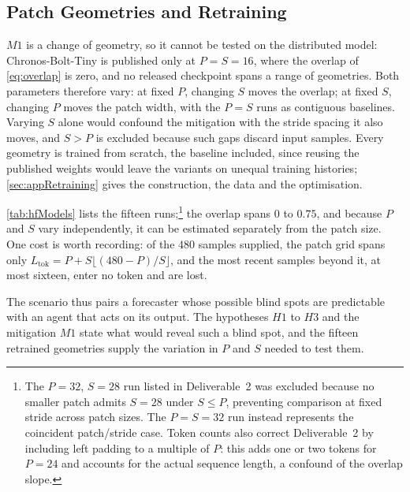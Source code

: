 \subsection{Patch Geometries and Retraining}\label{sec:geometries}
\begingroup
\let\subsection\subsubsection%
$M1$ is a change of geometry, so it cannot be tested on the distributed model: Chronos-Bolt-Tiny is published only at $P=S=16$, where the overlap of \autoref{eq:overlap} is zero, and no released checkpoint spans a range of geometries. Both parameters therefore vary: at fixed $P$, changing $S$ moves the overlap; at fixed $S$, changing $P$ moves the patch width, with the $P=S$ runs as contiguous baselines. Varying $S$ alone would confound the mitigation with the stride spacing it also moves, and $S>P$ is excluded because such gaps discard input samples. Every geometry is trained from scratch, the baseline included, since reusing the published weights would leave the variants on unequal training histories; \autoref{sec:appRetraining} gives the construction, the data and the optimisation.



\autoref{tab:hfModels} lists the fifteen runs;{\footnote{The $P=32$, $S=28$ run listed in Deliverable~2 was excluded because no smaller patch admits $S=28$ under $S\leq P$, preventing comparison at fixed stride across patch sizes. The $P=S=32$ run instead represents the coincident patch/stride case. Token counts also correct Deliverable~2 by including left padding to a multiple of $P$: this adds one or two tokens for $P=24$ and accounts for the actual sequence length, a confound of the overlap slope.}} the overlap spans $0$ to $0.75$, and because $P$ and $S$ vary independently, it can be estimated separately from the patch size. One cost is worth recording: of the $480$ samples supplied, the patch grid spans only $L_{\mathrm{tok}}=P+S\lfloor(480-P)/S\rfloor$, and the most recent samples beyond it, at most sixteen, enter no token and are lost.
\endgroup

The scenario thus pairs a forecaster whose possible blind spots are predictable with an agent that acts on its output. The hypotheses $H1$ to $H3$ and the mitigation $M1$ state what would reveal such a blind spot, and the fifteen retrained geometries supply the variation in $P$ and $S$ needed to test them.
